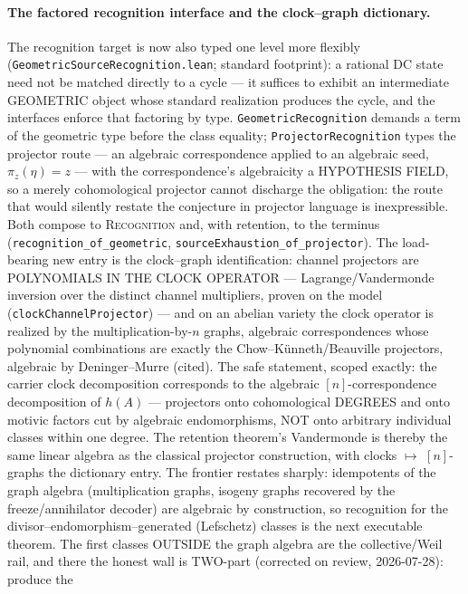 \documentclass[11pt]{article}
\theoremstyle{definition}
\theoremstyle{remark}
\begin{document}
\paragraph{The factored recognition interface and the clock--graph
dictionary.}  The recognition target is now also typed one level more
flexibly (\texttt{GeometricSourceRecognition.lean}; standard footprint):
a rational DC state need not be matched directly to a cycle --- it
suffices to exhibit an intermediate GEOMETRIC object whose standard
realization produces the cycle, and the interfaces enforce that factoring
by type.  \texttt{GeometricRecognition} demands a term of the geometric
type before the class equality; \texttt{ProjectorRecognition} types the
projector route --- an algebraic correspondence applied to an algebraic
seed, $\pi_z(\eta)=z$ --- with the correspondence's algebraicity a
HYPOTHESIS FIELD, so a merely cohomological projector cannot discharge
the obligation: the route that would silently restate the conjecture in
projector language is inexpressible.  Both compose to \textsc{Recognition}
and, with retention, to the terminus
(\texttt{recognition\_of\_geometric},
\texttt{sourceExhaustion\_of\_projector}).  The load-bearing new entry is
the clock--graph identification: channel projectors are POLYNOMIALS IN
THE CLOCK OPERATOR --- Lagrange/Vandermonde inversion over the distinct
channel multipliers, proven on the model
(\texttt{clockChannelProjector}) --- and on an abelian variety the clock
operator is realized by the multiplication-by-$n$ graphs, algebraic
correspondences whose polynomial combinations are exactly the
Chow--K\"unneth/Beauville projectors, algebraic by Deninger--Murre (cited).
The safe statement, scoped exactly: the carrier clock decomposition
corresponds to the algebraic $[n]$-correspondence decomposition of
$h(A)$ --- projectors onto cohomological DEGREES and onto motivic factors
cut by algebraic endomorphisms, NOT onto arbitrary individual classes
within one degree.  The retention theorem's Vandermonde is thereby the
same linear algebra as the classical projector construction, with clocks
$\mapsto$ $[n]$-graphs the dictionary entry.  The frontier restates
sharply: idempotents of the graph algebra (multiplication graphs, isogeny
graphs recovered by the freeze/annihilator decoder) are algebraic by
construction, so recognition for the divisor--endomorphism--generated
(Lefschetz) classes is the next executable theorem.  The first classes
OUTSIDE the graph algebra are the collective/Weil rail, and there the
honest wall is TWO-part (corrected on review, 2026-07-28): produce the
\end{document}
